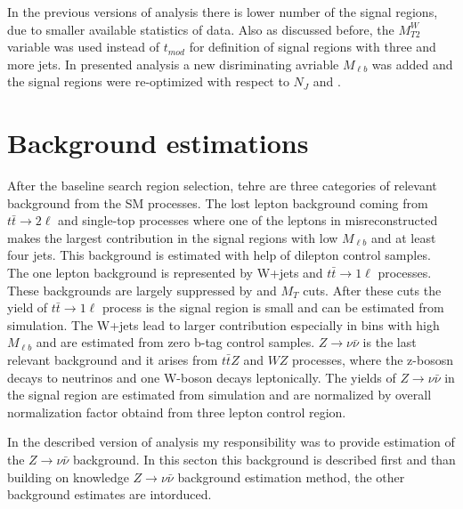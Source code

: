 In the previous versions of analysis there is lower number of the signal regions, due to smaller available statistics of data. Also as discussed before, the $M_{T2}^{W}$ variable was used instead of $t_{mod}$ for definition of signal regions with three and more jets. In presented analysis a new disriminating avriable $M_{\ell b}$ was added and the signal regions were re-optimized with respect to $N_{J}$ and \MET .





\section{Background estimations}

After the baseline search region selection, tehre are three categories of relevant background from  the SM processes. The lost lepton background coming from $t\bar{t} \to 2 \ell$ and single-top processes where one of the leptons in misreconstructed makes the largest contribution in the signal regions with low $M_{\ell b}$ and at least four jets. This background is estimated with help of dilepton control samples. The one lepton background is represented by W+jets and $t\bar{t} \to 1\ell$ processes. These backgrounds are largely suppressed by \MET and $M_{T}$ cuts. After these cuts the yield of $t\bar{t} \to 1\ell$ process is the signal region is small and can be estimated from simulation. The W+jets lead to larger contribution especially in bins with high $M_{\ell b}$ and are estimated from zero b-tag control samples. $Z \to \nu \bar{\nu}$ is the last relevant background and it arises from $t\bar{t}Z$ and $WZ$ processes, where the z-bososn decays to neutrinos and one W-boson decays leptonically. The yields of $Z \to \nu \bar{\nu}$ in the signal region are estimated from simulation and are normalized by overall normalization factor obtaind from three lepton control region.  

In the described version of analysis my responsibility was to provide estimation of the $Z \to \nu \bar{\nu}$ background. In this secton this background is described first and than building on knowledge $Z \to \nu \bar{\nu}$ background estimation method, the other background estimates are intorduced.


